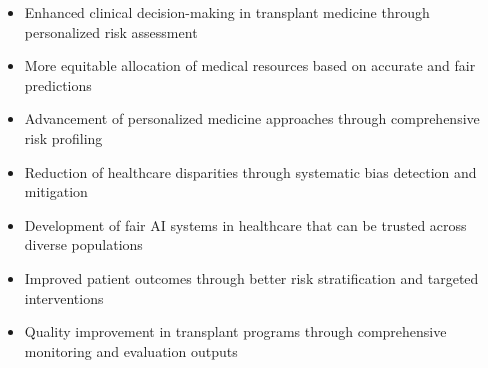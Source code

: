 \begin{itemize}
    \item Enhanced clinical decision-making in transplant medicine through personalized risk assessment \cite{astct_simplification}
    \item More equitable allocation of medical resources based on accurate and fair predictions
    \item Advancement of personalized medicine approaches through comprehensive risk profiling \cite{biorxiv_autoimmune}
    \item Reduction of healthcare disparities through systematic bias detection and mitigation \cite{jama_ai_medicine}
    \item Development of fair AI systems in healthcare that can be trusted across diverse populations
    \item Improved patient outcomes through better risk stratification and targeted interventions
    \item Quality improvement in transplant programs through comprehensive monitoring and evaluation outputs
\end{itemize}